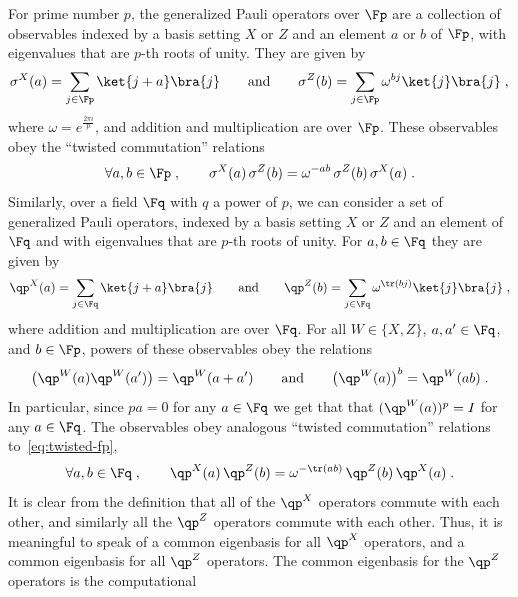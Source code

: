 For prime number $p$, the generalized Pauli operators over $\Fp$ are a
collection of observables indexed by a basis setting $X$ or $Z$ and an element
$a$ or $b$ of $\Fp$, with eigenvalues that are $p$-th roots of unity.
They are given by
\begin{equation}
  \label{eq:pauli-fp}
  \sigma^X(a) = \sum_{j \in \Fp} \ket{j + a} \bra{j}\qquad \text{and} \qquad
  \sigma^Z(b) = \sum_{j \in \Fp} \omega^{bj} \ket{j} \bra{j}\;,
\end{equation}
where $\omega = e^{\frac{2\pi i}{p}}$, and addition and multiplication are over
$\Fp$.
These observables obey the ``twisted commutation'' relations
\begin{equation}
  \label{eq:twisted-fp}
  \forall a,b\in\Fp\;,\qquad \sigma^X(a)\, \sigma^Z(b) =
  \omega^{-ab} \,\sigma^Z(b)\,\sigma^X(a)\;.
\end{equation}
Similarly, over a field $\Fq$ with $q$ a power of $p$, we can consider a set of generalized Pauli
operators, indexed by a basis setting $X$ or $Z$ and an element of $\Fq$ and
with eigenvalues that are $p$-th roots of unity.
For $a, b\in\Fq$ they are given by
\begin{equation*}
  \qp^X(a) = \sum_{j \in \Fq} \ket{j+a}\bra{j} \qquad \text{and} \qquad
  \qp^Z(b)= \sum_{j \in \Fq} \omega^{\tr(b j)} \ket{j}\bra{j}\;,
\end{equation*}
where addition and multiplication are over $\Fq$.
For all $W \in \{X,Z\}$, $a, a' \in \Fq$, and $b \in \Fp$, powers of these
observables obey the relations
\begin{equation*}\label{eq:pauli-product-power}
  \bigl(\qp^W(a)\qp^W(a')\bigr) = \qp^W(a+a') \qquad \text{and}
  \qquad \bigl( \qp^W(a) \bigr)^b = \qp^W(a b) \;.
\end{equation*}
In particular, since $pa=0$ for any $a\in \Fq$ we get that that $(\qp^W(a))^p =
I$ for any $a\in\Fq$.
The observables obey analogous ``twisted commutation'' relations
to~\eqref{eq:twisted-fp},
\begin{equation}
  \label{eq:twisted-fq}
  \forall a, b \in \Fq\;, \qquad \qp^X(a)\, \qp^Z(b) =
  \omega^{-\tr(a b)} \, \qp^Z(b)\, \qp^X(a)\;.
\end{equation}
It is clear from the definition that all of the $\qp^X$ operators commute with
each other, and similarly all the $\qp^Z$ operators commute with each other.
Thus, it is meaningful to speak of a common eigenbasis for all $\qp^X$
operators, and a common eigenbasis for all $\qp^Z$ operators.
The common eigenbasis for the $\qp^Z$ operators is the computational

